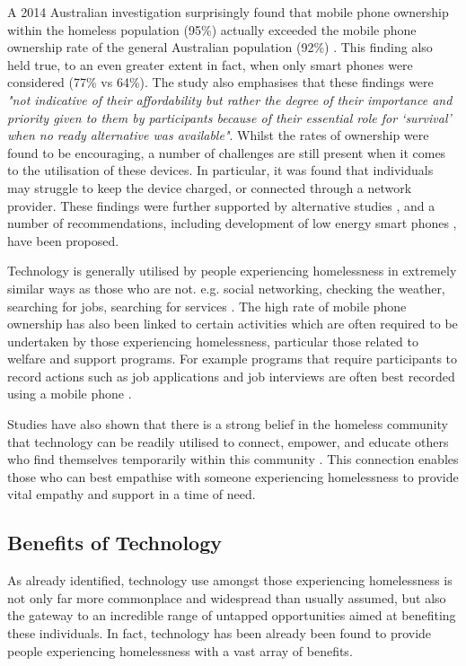 A 2014 Australian investigation surprisingly found that mobile phone ownership within the homeless population (95\%) actually exceeded the mobile phone ownership rate of the general Australian population (92\%) \cite{humphry2014importance}. This finding also held true, to an even greater extent in fact, when only smart phones were considered (77\% vs 64\%). The study also emphasises that these findings were \emph{"not indicative of their affordability but rather the degree of their importance and priority given to them by participants because of their essential role for ‘survival’ when no ready alternative was available"}. Whilst the rates of ownership were found to be encouraging, a number of challenges are still present when it comes to the utilisation of these devices. In particular, it was found that individuals may struggle to keep the device charged, or connected through a network provider. These findings were further supported by alternative studies \cite{raven2018mobile} \cite{woelfer2011artifacts}, and a number of recommendations, including development of low energy smart phones \cite{kinzer2014low}, have been proposed.

Technology is generally utilised by people experiencing homelessness in extremely similar ways as those who are not. e.g. social networking, checking the weather, searching for jobs, searching for services \cite{rhoades2017no} \cite{eyrich2011sheltered} \cite{woelfer2010homeless}. The high rate of mobile phone ownership has also been linked to certain activities which are often required to be undertaken by those experiencing homelessness, particular those related to welfare and support programs. For example programs that require participants to record actions such as job applications and job interviews are often best recorded using a mobile phone \cite{humphry2014importance}.

Studies have also shown that there is a strong belief in the homeless community that technology can be readily utilised to connect, empower, and educate others who find themselves temporarily within this community \cite{eyrich2011sheltered}. This connection enables those who can best empathise with someone experiencing homelessness to provide vital empathy and support in a time of need.

\subsection{Benefits of Technology}

As already identified, technology use amongst those experiencing homelessness is not only far more commonplace and widespread than usually assumed, but also the gateway to an incredible range of untapped opportunities aimed at benefiting these individuals. In fact, technology has been already been found to provide people experiencing homelessness with a vast array of benefits.

